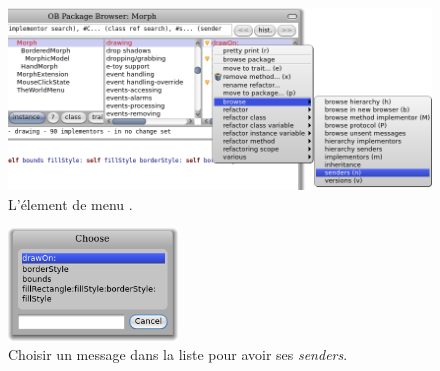 \documentclass[a4paper,10pt,twoside]{book}
\begin{document}
\begin{figure}[htb]
\centerline {\includegraphics[width=\textwidth]{SendersOfDrawOn}}
\caption{L'élement de menu .}
 \end{figure}

\begin{figure}[htb]
\centerline {\includegraphics[width=0.4\textwidth]{SendersOfDrawOn2}}
\caption{Choisir un message dans la liste pour avoir ses \emph{senders}.}
\end{figure}

\end{document}
